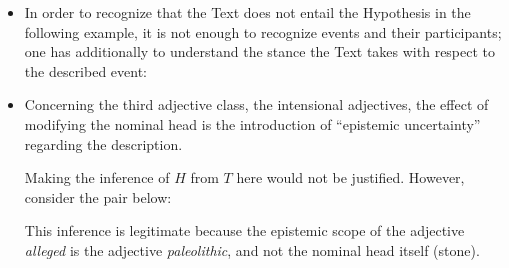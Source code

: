 \documentclass[10pt]{article}
\begin{document}
\begin{itemize}
\item In order to recognize that the Text does not entail the Hypothesis in the following example, it is not enough to recognize events and their participants;  one has additionally to understand the stance the Text takes with respect to the described event:


 
\item Concerning the third adjective class, the intensional adjectives, the effect of modifying the nominal head is the introduction of ``epistemic uncertainty'' regarding the description. 


\noindent Making the  inference of $H$ from $T$ here would  not be justified. However,  consider the pair below:


\noindent This inference is legitimate because the epistemic scope of the adjective {\it alleged} is the adjective {\it paleolithic}, and not the nominal head  itself (stone). 
\end{itemize}
\end{document}
